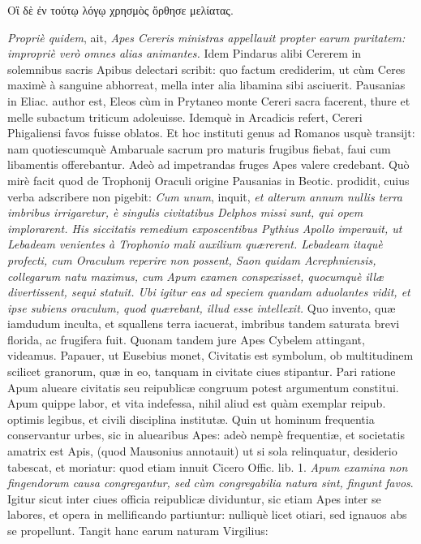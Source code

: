 \documentclass[a4paper, 11pt, oneside, polutonikogreek, latin]{article}
\begin{document}
Οἳ δὲ ἐν τούτῳ λόγῳ χρησμὸς ὄρθησε μελίατας.

\emph{Propriè quidem}, ait, \emph{Apes Cereris ministras appellauit propter earum puritatem: impropriè verò omnes alias animantes.} Idem Pindarus alibi Cererem in solemnibus sacris Apibus delectari scribit: quo factum crediderim, ut cùm Ceres maximè à sanguine abhorreat, mella inter alia libamina sibi asciuerit. Pausanias in Eliac. author est, Eleos cùm in Prytaneo monte Cereri sacra facerent, thure et melle subactum triticum adoleuisse. Idemquè in Arcadicis refert, Cereri Phigaliensi favos fuisse oblatos. Et hoc instituti genus ad Romanos usquè transijt: nam quotiescumquè Ambaruale sacrum pro maturis frugibus fiebat, faui cum libamentis offerebantur. Adeò ad impetrandas fruges Apes valere credebant. Quò mirè facit quod de Trophonij Oraculi origine Pausanias in Beotic. prodidit, cuius verba adscribere non pigebit: \emph{Cum unum}, inquit, \emph{et alterum annum nullis terra imbribus irrigaretur, è singulis civitatibus Delphos missi sunt, qui opem implorarent. His siccitatis remedium exposcentibus Pythius Apollo imperauit, ut Lebadeam venientes à Trophonio mali auxilium quærerent. Lebadeam itaquè profecti, cum Oraculum reperire non possent, Saon quidam Acrephniensis, collegarum natu maximus, cum Apum examen conspexisset, quocumquè illæ divertissent, sequi statuit. Ubi igitur eas ad speciem quandam aduolantes vidit, et ipse subiens oraculum, quod quærebant, illud esse intellexit.} Quo invento, quæ iamdudum inculta, et squallens terra iacuerat, imbribus tandem saturata brevi florida, ac frugifera fuit. Quonam tandem jure Apes Cybelem attingant, videamus. Papauer, ut Eusebius monet, Civitatis est symbolum, ob multitudinem scilicet granorum, quæ in eo, tanquam in civitate ciues stipantur. Pari ratione Apum alueare civitatis seu reipublicæ congruum potest argumentum constitui. Apum quippe labor, et vita indefessa, nihil aliud est quàm exemplar reipub. optimis legibus, et civili disciplina institutæ. Quin ut hominum frequentia conservantur urbes, sic in aluearibus Apes: adeò nempè frequentiæ, et societatis amatrix est Apis, (quod Mausonius annotauit) ut si sola relinquatur, desiderio tabescat, et moriatur: quod etiam innuit Cicero Offic. lib. 1. \emph{Apum examina non fingendorum causa congregantur, sed cùm congregabilia natura sint, fingunt favos}. Igitur sicut inter ciues officia reipublicæ dividuntur, sic etiam Apes inter se labores, et opera in mellificando partiuntur: nulliquè licet otiari, sed ignauos abs se propellunt. Tangit hanc earum naturam Virgilius:
\end{document}
